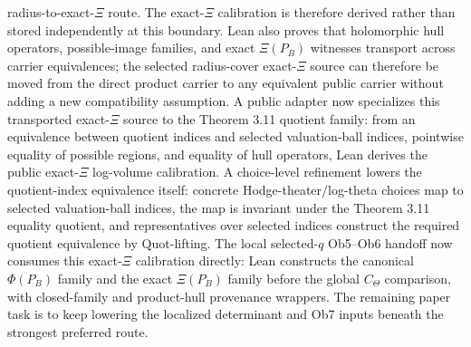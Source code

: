 \begin{proposition}
  radius-to-exact-\(\Xi\) route.  The exact-\(\Xi\) calibration is therefore
  derived rather than stored independently at this boundary.  Lean also proves
  that holomorphic hull operators, possible-image families, and exact
  \(\Xi(P_B)\) witnesses transport across carrier equivalences; the selected
  radius-cover exact-\(\Xi\) source can therefore be moved from the direct
  product carrier to any equivalent public carrier without adding a new
  compatibility assumption.  A public adapter now specializes this transported
  exact-\(\Xi\) source to the Theorem 3.11 quotient family: from an equivalence
  between quotient indices and selected valuation-ball indices, pointwise
  equality of possible regions, and equality of hull operators, Lean derives
  the public exact-\(\Xi\) log-volume calibration.  A choice-level refinement
  lowers the quotient-index equivalence itself: concrete Hodge-theater/log-theta
  choices map to selected valuation-ball indices, the map is invariant under
  the Theorem 3.11 equality quotient, and representatives over selected indices
  construct the required quotient equivalence by \(\mathrm{Quot}\)-lifting.
  The local selected-\(q\) Ob5--Ob6 handoff now consumes this exact-\(\Xi\)
  calibration directly: Lean constructs the canonical \(\Phi(P_B)\) family
  and the exact \(\Xi(P_B)\) family before the global \(C_\Theta\) comparison,
  with closed-family and product-hull provenance wrappers.  The remaining
  paper task is to keep lowering the localized determinant and Ob7 inputs
  beneath the strongest preferred route.

\end{proposition}
